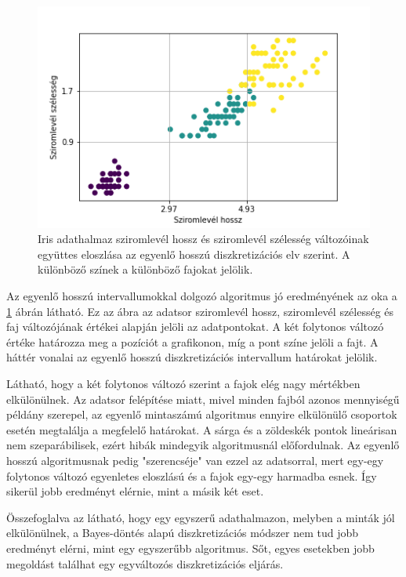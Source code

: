 \begin{figure}[htp]\centering
    \includegraphics[width=12cm]{figures/IrisEloszlas.png}
    \caption{Iris adathalmaz sziromlevél hossz és sziromlevél szélesség változóinak együttes eloszlása az egyenlő hosszú diszkretizációs elv szerint. A különböző színek a különböző fajokat jelölik.}
    \label{fig:iris-eloszlas}
\end{figure}

Az egyenlő hosszú intervallumokkal dolgozó algoritmus jó eredményének az oka a \ref{fig:iris-eloszlas} ábrán látható. Ez az ábra az adatsor sziromlevél hossz, sziromlevél szélesség és faj változójának értékei alapján jelöli az adatpontokat. A két folytonos változó értéke határozza meg a pozíciót a grafikonon, míg a pont színe jelöli a fajt. A háttér vonalai az egyenlő hosszú diszkretizációs intervallum határokat jelölik.

Látható, hogy a két folytonos változó szerint a fajok elég nagy mértékben elkülönülnek. Az adatsor felépítése miatt, mivel minden fajból azonos mennyiségű példány szerepel, az egyenlő mintaszámú algoritmus ennyire elkülönülő csoportok esetén megtalálja a megfelelő határokat. A sárga és a zöldeskék pontok lineárisan nem szeparábilisek, ezért hibák mindegyik algoritmusnál előfordulnak. Az egyenlő hosszú algoritmusnak pedig "szerencséje" van ezzel az adatsorral, mert egy-egy folytonos változó egyenletes eloszlású és a fajok egy-egy harmadba esnek. Így sikerül jobb eredményt elérnie, mint a másik két eset.

Összefoglalva az látható, hogy egy egyszerű adathalmazon, melyben a minták jól elkülönülnek, a Bayes-döntés alapú diszkretizációs módszer nem tud jobb eredményt elérni, mint egy egyszerűbb algoritmus. Sőt, egyes esetekben jobb megoldást találhat egy egyváltozós diszkretizációs eljárás.